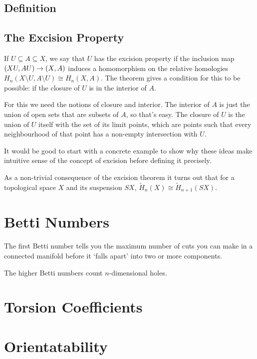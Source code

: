 \documentclass[oneside,english]{amsbook}
\numberwithin{section}{chapter}
\theoremstyle{plain}
\theoremstyle{definition}
\begin{document}
	\subsection{Definition}
	
	\subsection{The Excision Property}
	
	If $U\subseteq A\subseteq X$, we say that $U$ has the excision property if the inclusion map $(X\\ U, A\\ U)\to (X, A)$ induces a homomorphism on the relative homologies $H_{n}(X\setminus U,A\setminus U)\cong H_{n}(X,A)$. The theorem gives a condition for this to be possible: if the closure of $U$ is in the interior of $A$.
	
	For this we need the notions of closure and interior. The interior of $A$ is just the union of open sets that are subsets of $A$, so that's easy. The closure of $U$ is the union of $U$ itself with the set of its limit points, which are points such that every neighbourhood of that point has a non-empty intersection with $U$.
	
	It would be good to start with a concrete example to show why these ideas make intuitive sense of the concept of excision before defining it precisely.
	
	As a non-trivial consequence of the excision theorem it turns out that for a topological space $X$ and its suspension $SX$, $\widetilde{H}_n(X)\cong \widetilde{H}_{n+1}(SX)$.

	\section{Betti Numbers}
	
	The first Betti number tells you the maximum number of cuts you can make in a connected manifold before it `falls apart' into two or more components. 
	
	The higher Betti numbers count $n$-dimensional holes.
	
	\section{Torsion Coefficients}

	\section{Orientatability}
	
\end{document}
